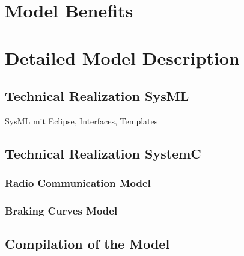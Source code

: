 \documentclass{template/openetcs_article}
\begin{document}

\section{Model Benefits}
\label{sec:model-highlights}

%
%


\section{Detailed Model Description}
\label{sec:deta-model-descr}

\subsection{Technical Realization SysML}
SysML mit Eclipse, Interfaces, Templates

\subsection{Technical Realization SystemC}

\subsubsection{Radio Communication Model}

\subsubsection{Braking Curves Model}



\subsection{Compilation of the Model}
\end{document}
